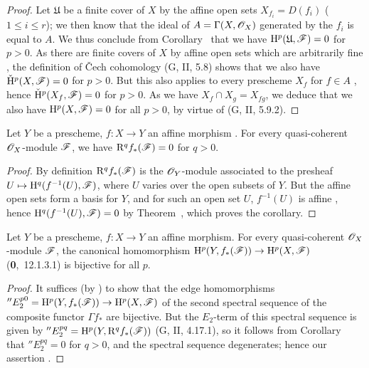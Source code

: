 \begin{proof}
\label{proof-3.1.3.1}
Let $\mathfrak{U}$ be a finite cover of $X$ by the affine open sets $X_{f_i}=D(f_i)$ ($1\leq i\leq r$); we then know that the ideal of $A=\Gamma(X,\mathscr{O}_X)$ generated by the $f_i$ is equal to $A$.
We thus conclude from Corollary~ that we have $\mathrm{H}^p(\mathfrak{U},\mathscr{F})=0$ for $p>0$.
As there are finite covers of $X$ by affine open sets which are arbitrarily fine , the definition of \v Cech cohomology (G, II, 5.8) shows that we also have $\check{\mathrm{H}}^p(X,\mathscr{F})=0$ for $p>0$.
But this also applies to every prescheme $X_f$ for $f\in A$ , hence $\check{\mathrm{H}}^p(X_f,\mathscr{F})=0$ for $p>0$.
As we have $X_f\cap X_g=X_{fg}$, we deduce that we also have $\mathrm{H}^p(X,\mathscr{F})=0$ for all $p>0$, by virtue of (G, II, 5.9.2).
\end{proof}

\begin{corollary}[1.3.2]
\label{3.1.3.2}
Let $Y$ be a prescheme, $f:X\to Y$ an affine morphism .
For every quasi-coherent $\mathscr{O}_X$-module $\mathscr{F}$, we have $\mathrm{R}^q f_*(\mathscr{F})=0$ for $q>0$.
\end{corollary}

\begin{proof}
\label{proof-3.1.3.2}
By definition $\mathrm{R}^q f_*(\mathscr{F})$ is the $\mathscr{O}_Y$-module associated to the presheaf $U\mapsto\HH^q(f^{-1}(U),\sh{F})$, where $U$ varies over the open subsets of $Y$.
But the affine open sets form a basis for $Y$, and for such an open set $U$, $f^{-1}(U)$ is affine , hence $\mathrm{H}^q(f^{-1}(U),\mathscr{F})=0$ by Theorem~, which proves the corollary.
\end{proof}

\begin{corollary}[1.3.3]
\label{3.1.3.3}
Let $Y$ be a prescheme, $f:X\to Y$ an affine morphism.
For every quasi-coherent $\mathscr{O}_X$-module $\mathscr{F}$, the canonical homomorphism $\HH^p(Y,f_*(\sh{F}))\to\HH^p(X,\sh{F})$ (\textbf{0},~12.1.3.1) is bijective for all $p$.
\end{corollary}

\begin{proof}
\label{proof-3.1.3.3}
It suffices (by ) to show that the edge homomorphisms $''E_2^{p0}=\HH^p(Y,f_*(\sh{F}))\to\HH^p(X,\sh{F})$ of the second spectral sequence of the composite functor $\Gamma f_*$ are bijective.
But the $E_2$-term of this spectral sequence is given by $''E_2^{pq}=\mathrm{H}^p(Y,\mathrm{R}^q f_*(\mathscr{F}))$ (G, II, 4.17.1), so it follows from Corollary~ that $''E_2^{pq}=0$ for $q>0$, and the spectral sequence degenerates; hence our assertion .
\end{proof}

